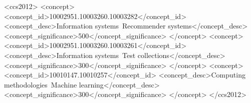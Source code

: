 \begin{CCSXML}
<ccs2012>
 <concept>
  <concept_id>10002951.10003260.10003282</concept_id>
  <concept_desc>Information systems~Recommender systems</concept_desc>
  <concept_significance>500</concept_significance>
 </concept>
 <concept>
  <concept_id>10002951.10003260.10003261</concept_id>
  <concept_desc>Information systems~Test collections</concept_desc>
  <concept_significance>300</concept_significance>
 </concept>
 <concept>
  <concept_id>10010147.10010257</concept_id>
  <concept_desc>Computing methodologies~Machine learning</concept_desc>
  <concept_significance>300</concept_significance>
 </concept>
</ccs2012>
\end{CCSXML}


